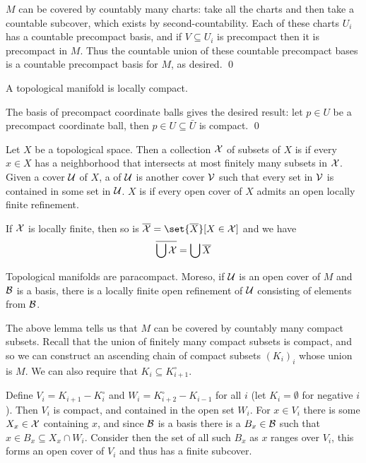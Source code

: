     $M$ can be covered by countably many charts: take all the charts and then take a countable subcover, which exists by second-countability.
    Each of these charts $U_i$ has a countable precompact basis, and if $V\subseteq U_i$ is precompact then it is precompact in $M$.
    Thus the countable union of these countable precompact bases is a countable precompact basis for $M$, as desired.
    \qed

\eproof

\bcoro

    A topological manifold is locally compact.

\ecoro

\bproof

    The basis of precompact coordinate balls gives the desired result: let $p\in U$ be a precompact coordinate ball, then $p\in U\subseteq\bar U$ is compact.
    \qed

\eproof

\bdefn

    Let $X$ be a topological space.
    Then a collection ${\cal X}$ of subsets of $X$ is  if every $x\in X$ has a neighborhood that intersects at most finitely many subsets in ${\cal X}$.
    Given a cover ${\cal U}$ of $X$, a  of ${\cal U}$ is another cover ${\cal V}$ such that every set in ${\cal V}$ is contained in some set in ${\cal U}$.
    $X$ is  if every open cover of $X$ admits an open locally finite refinement.

\edefn

If ${\cal X}$ is locally finite, then so is $\cl{\c X}=\set{\cl X}[X\in\c X]$ and we have
$$ \overline{\bigcup{\cal X}} = \bigcup\overline X $$

\bthrm

    Topological manifolds are paracompact.
    Moreso, if ${{\cal U}}$ is an open cover of $M$ and ${{\cal B}}$ is a basis, there is a locally finite open refinement of ${{\cal U}}$ consisting of elements from ${{\cal B}}$.

\ethrm

\bproof

    The above lemma tells us that $M$ can be covered by countably many compact subsets.
    Recall that the union of finitely many compact subsets is compact, and so we can construct an ascending chain of compact subsets $(K_i)_i$ whose union is $M$.
    We can also require that $K_i\subseteq K^\circ_{i+1}$.

    Define $V_i=K_{i+1}-K_i^\circ$ and $W_i=K_{i+2}^\circ-K_{i-1}$ for all $i$ (let $K_i=\emptyset$ for negative $i$).
    Then $V_i$ is compact, and contained in the open set $W_i$.
    For $x\in V_i$ there is some $X_x\in{\cal X}$ containing $x$, and since ${{\cal B}}$ is a basis there is a $B_x\in{{\cal B}}$ such that $x\in B_x\subseteq X_x\cap W_i$.
    Consider then the set of all such $B_x$ as $x$ ranges over $V_i$, this forms an open cover of $V_i$ and thus has a finite subcover.

